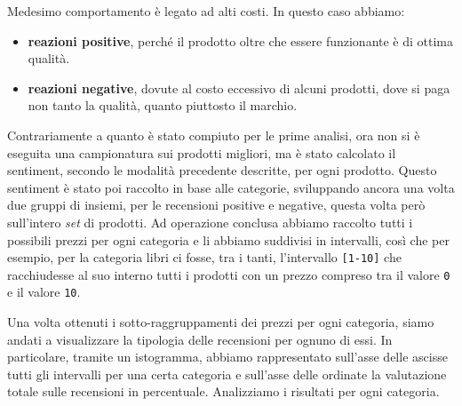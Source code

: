 		Medesimo comportamento è legato ad alti costi. In questo caso abbiamo:
		
		\begin{itemize}
			\item \textbf{reazioni positive}, perché il prodotto oltre che essere funzionante è di ottima qualità.
			\item \textbf{reazioni negative}, dovute al costo eccessivo di alcuni prodotti, dove si paga non tanto la qualità, quanto piuttosto il marchio.
		\end{itemize}
	
		Contrariamente a quanto è stato compiuto per le prime analisi, ora non si è eseguita una campionatura sui prodotti migliori, ma è stato calcolato il sentiment, secondo le modalità precedente descritte, per ogni prodotto. Questo sentiment è stato poi raccolto in base alle categorie, sviluppando ancora una volta due gruppi di insiemi, per le recensioni positive e negative, questa volta però sull'intero \textit{set} di prodotti. Ad operazione conclusa abbiamo raccolto tutti i possibili prezzi per ogni categoria e li abbiamo suddivisi in intervalli, così che per esempio, per la categoria libri ci fosse, tra i tanti, l'intervallo \verb|[1-10]| che racchiudesse al suo interno tutti i prodotti con un prezzo compreso tra il valore \verb|0| e il valore \verb|10|. 

		Una volta ottenuti i sotto-raggruppamenti dei prezzi per ogni categoria, siamo andati a visualizzare la tipologia delle recensioni per ognuno di essi. In particolare, tramite un istogramma, abbiamo rappresentato sull'asse delle ascisse tutti gli intervalli per una certa categoria e sull'asse delle ordinate la valutazione totale sulle recensioni in percentuale. Analizziamo i risultati per ogni categoria.
		

